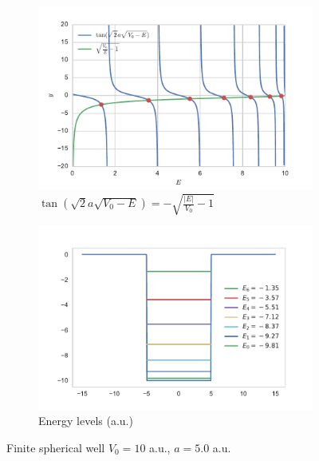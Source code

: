 \documentclass[a4paper, 12pt]{article}
\begin{document}
\begin{figure}[h!]
\centering
\begin{subfigure}{.5\textwidth}
  \centering
  \includegraphics[width=1.0\linewidth]{tan-sqrt.pdf}
  \caption{$\tan(\sqrt{2} a \sqrt{V_0-E})=-\sqrt{\frac{|E|}{V_0}-1}$}
  \label{fig1:tan-sqrt}
\end{subfigure}%
\begin{subfigure}{.5\textwidth}
  \centering
  \includegraphics[width=1.0\linewidth]{ens_finite.pdf}
  \caption{Energy levels (a.u.)}
  \label{fig:finite_well_sol}
\end{subfigure}
\caption{Finite spherical well $V_0 = 10$ a.u., $a=5.0$ a.u.}
\label{fig:fin_well}
\end{figure}
\end{document}

